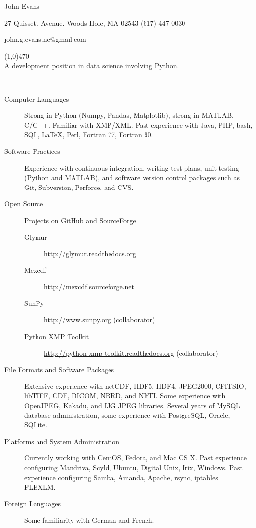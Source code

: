 \documentclass[11pt]{article}  %
\begin{document}
 
\centerline{{\Huge \sc John Evans}  }   %
\centerline{27 Quissett Avenue. \textbullet \hspace{5pt} Woods Hole, MA  02543 \textbullet \hspace{5pt}  (617) 447-0030} 
\centerline{john.g.evans.ne@gmail.com} 
\noindent
\line(1,0){470}  \\

\smallskip %
\noindent
A development position in data science involving Python.\medskip

\bigskip %
\\ 
\begin{description}
  \item[Computer Languages]Strong in Python (Numpy, Pandas, Matplotlib), strong
    in MATLAB, C/C++.  Familiar with XMP/XML.  Past experience with Java, PHP,
    bash, SQL, \LaTeX, Perl, Fortran 77, Fortran 90.
  \item[Software Practices]Experience with continuous integration, writing
    test plans, unit testing (Python and MATLAB), and software version control
    packages such as Git, Subversion, Perforce, and CVS.
  \item[Open Source]Projects on GitHub and SourceForge
    \begin{description}
      \item[Glymur]\url{http://glymur.readthedocs.org}
      \item[Mexcdf]\url{http://mexcdf.sourceforge.net}
      \item[SunPy]\url{http://www.sunpy.org} (collaborator)
      \item[Python XMP Toolkit]\url{http://python-xmp-toolkit.readthedocs.org}
        (collaborator)
    \end{description}
  \item[File Formats and Software Packages]Extensive experience with netCDF,
    HDF5, HDF4, JPEG2000, CFITSIO, libTIFF, CDF, DICOM, NRRD, and
    NIfTI.  Some experience with OpenJPEG, Kakadu, and IJG JPEG
    libraries.  Several years of MySQL database administration,
    some experience with PostgreSQL, Oracle, SQLite.
  \item[Platforms and System Administration]Currently working with CentOS,
    Fedora, and Mac OS X.  Past experience configuring Mandriva, Scyld, Ubuntu,
    Digital Unix, Irix, Windows.  Past experience configuring Samba, Amanda,
    Apache, rsync, iptables, FLEXLM.
  \item[Foreign Languages]Some familiarity with German and French.
\end{description}
\end{document}
